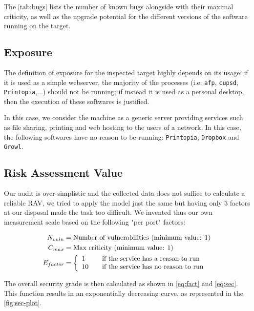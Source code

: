 \documentclass[10pt,a4paper,twoside,onecolumn]{article}
\begin{document}
The \autoref{tab:bugs} lists the number of known bugs alongside with their maximal criticity, as well as the upgrade potential for the different versions of the software running on the target.


\subsection{Exposure}

The definition of exposure for the inspected target highly depends on its usage: if it is used as a simple webserver, the majority of the processes (i.e. \texttt{afp}, \texttt{cupsd}, \texttt{Printopia},...) should not be running; if instead it is used as a personal desktop, then the execution of these softwares is justified.

In this case, we consider the machine as a generic server providing services such as file sharing, printing and web hosting to the users of a network. In this case, the following softwares have no reason to be running: \texttt{Printopia}, \texttt{Dropbox} and \texttt{Growl}.

\subsection{Risk Assessment Value}

Our audit is over-simplistic and the collected data does not suffice to calculate a reliable RAV, we tried to apply the model just the same but having only 3 factors at our disposal made the task too difficult. We invented thus our own measurement scale based on the following "per port" factors:

\vspace{-.5cm}
\begin{align*}
	N_{vuln} &= \text{Number of vulnerabilities (minimum value: 1)} \\
	 C_{max} &= \text{Max criticity (minimum value: 1)} \\
  E_{factor} &= \left\{
		\begin{array}{l l}
			1 & \quad \text{if the service has a reason to run}\\
		   10 & \quad \text{if the service has no reason to run}\\
		\end{array}
	\right.
\end{align*}

The overall security grade is then calculated as shown in \autoref{eq:fact} and \ref{eq:sec}. This function results in an exponentially decreasing curve, as represented in the \autoref{fig:sec-plot}.
\end{document}
